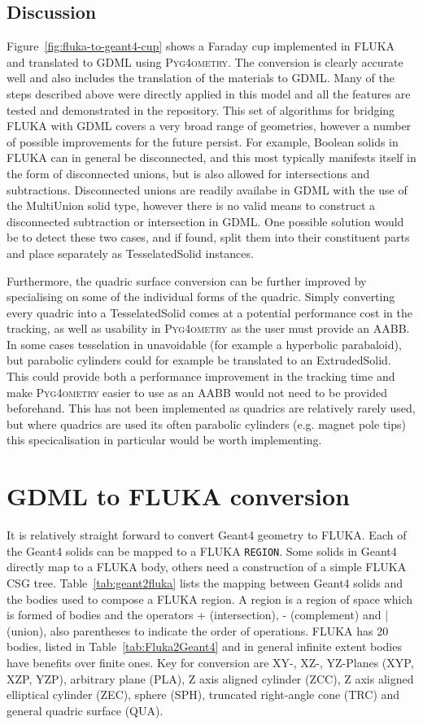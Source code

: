 \documentclass[final,5p,times,twocolumn]{elsarticle}
\newcommand{\PYGEOMETRY}{\textsc{Pyg4ometry}}
\begin{document}
\subsection{Discussion}

Figure~\ref{fig:fluka-to-geant4-cup} shows a Faraday cup implemented in
FLUKA and translated to GDML using \PYGEOMETRY{}.  The conversion is clearly
accurate well and also includes the translation of the materials to GDML.
Many of the steps described above were directly applied in this model and
all the features are tested and demonstrated in the repository.  This set
of algorithms for bridging FLUKA with GDML covers a very broad range of
geometries, however a number of possible improvements for the future
persist.  For example, Boolean solids in FLUKA can in general be
disconnected, and this most typically manifests itself in the form of
disconnected unions, but is also allowed for intersections and
subtractions.  Disconnected unions are readily availabe in GDML with the
use of the MultiUnion solid type, however there is no valid means to
construct a disconnected subtraction or intersection in GDML.  One possible
solution would be to detect these two cases, and if found, split them into
their constituent parts and place separately as TesselatedSolid instances.

Furthermore, the quadric surface conversion can be further improved by
specialising on some of the individual forms of the quadric.  Simply
converting every quadric into a TesselatedSolid comes at a potential
performance cost in the tracking, as well as usability in \PYGEOMETRY{} as the
user must provide an AABB.  In some cases tesselation in unavoidable (for
example a hyperbolic parabaloid), but parabolic cylinders could for example
be translated to an ExtrudedSolid.  This could provide both a performance
improvement in the tracking time and make \PYGEOMETRY{} easier to use as an
AABB would not need to be provided beforehand.  This has not been
implemented as quadrics are relatively rarely used, but where quadrics are
used its often parabolic cylinders (e.g. magnet pole tips) this
specicalisation in particular would be worth implementing.

\section{GDML to FLUKA conversion}
It is relatively straight forward to convert Geant4 geometry to FLUKA. Each of the Geant4 
solids can be mapped to a FLUKA \verb|REGION|. Some solids in Geant4 directly map to 
a FLUKA body, others need a construction of a simple FLUKA CSG tree. Table~\ref{tab:geant2fluka}
lists the mapping between Geant4 solids and the bodies used to compose a FLUKA region.
A region is a region of space which is formed of bodies and the operators + (intersection), - 
(complement) and | (union), also parentheses to indicate the order of operations. FLUKA 
has 20 bodies, listed in Table~\ref{tab:Fluka2Geant4}  and in general infinite extent bodies have benefits over finite ones. Key 
for conversion are XY-, XZ-, YZ-Planes (XYP, XZP, YZP), arbitrary plane (PLA), 
Z axis aligned cylinder (ZCC), Z axis aligned elliptical cylinder (ZEC), 
sphere (SPH), truncated right-angle cone (TRC) and general quadric surface (QUA). 
\end{document}
